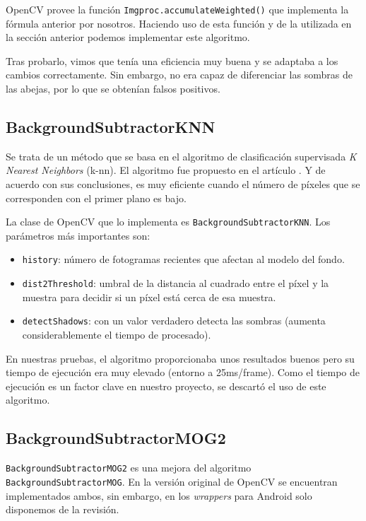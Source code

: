 OpenCV provee la función \texttt{Imgproc.accumulateWeighted()} que
implementa la fórmula anterior por nosotros. Haciendo uso de esta
función y de la utilizada en la sección anterior podemos implementar
este algoritmo.

Tras probarlo, vimos que tenía una eficiencia muy buena y se adaptaba a
los cambios correctamente. Sin embargo, no era capaz de diferenciar las
sombras de las abejas, por lo que se obtenían falsos positivos.

\subsection{BackgroundSubtractorKNN}\label{backgroundsubtractorknn}

Se trata de un método que se basa en el algoritmo de clasificación
supervisada \emph{K Nearest Neighbors} (k-nn). El algoritmo fue
propuesto en el artículo \citep{art:zivkovic_efficient_2006}. Y de
acuerdo con sus conclusiones, es muy eficiente cuando el número de
píxeles que se corresponden con el primer plano es bajo.

La clase de OpenCV que lo implementa es
\texttt{BackgroundSubtractorKNN}. Los parámetros más importantes son:

\begin{itemize}
\tightlist
\item
  \texttt{history}: número de fotogramas recientes que afectan al modelo
  del fondo.
\item
  \texttt{dist2Threshold}: umbral de la distancia al cuadrado entre el
  píxel y la muestra para decidir si un píxel está cerca de esa muestra.
\item
  \texttt{detectShadows}: con un valor verdadero detecta las sombras
  (aumenta considerablemente el tiempo de procesado).
\end{itemize}

En nuestras pruebas, el algoritmo proporcionaba unos resultados buenos
pero su tiempo de ejecución era muy elevado (entorno a 25ms/frame). Como
el tiempo de ejecución es un factor clave en nuestro proyecto, se
descartó el uso de este algoritmo.

\subsection{BackgroundSubtractorMOG2}\label{backgroundsubtractormog2}

\texttt{BackgroundSubtractorMOG2} es una mejora del algoritmo
\texttt{BackgroundSubtractorMOG}. En la versión original de OpenCV se
encuentran implementados ambos, sin embargo, en los \emph{wrappers} para
Android solo disponemos de la revisión.

